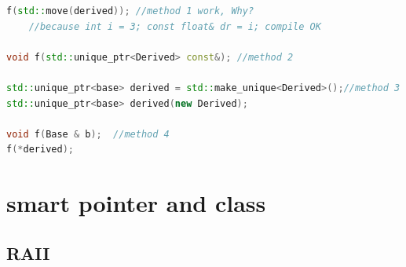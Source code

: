 \documentclass[a4paper,11pt,twoside]{book}
\begin{document}
\begin{itemize}
\begin{lstlisting}[frame=single, language=c++, mathescape=true]
f(std::move(derived)); //method 1 work, Why?
    //because int i = 3; const float& dr = i; compile OK
                       
void f(std::unique_ptr<Derived> const&); //method 2

std::unique_ptr<base> derived = std::make_unique<Derived>();//method 3 
std::unique_ptr<base> derived(new Derived);

void f(Base & b);  //method 4
f(*derived);
\end{lstlisting}


\end{itemize}

\section{smart pointer and class}
\subsection{RAII}
\end{document}
